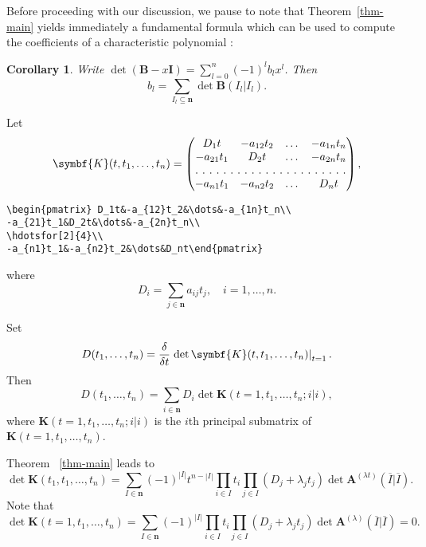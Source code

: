 \documentclass{article}
\newtheorem{cor}[thm]{Corollary}
\theoremstyle{definition}
\theoremstyle{remark}
\newcommand{\thmref}[1]{Theorem~\ref{#1}}
\newcommand{\eval}[2][\right]{\relax
  \ifx#1\right\relax \left.\fi#2#1\rvert}
\newcommand{\envert}[1]{\left\lvert#1\right\rvert}
\begin{document}
Before proceeding with our discussion, we pause to note that
\thmref{thm-main} yields immediately a fundamental formula which can be
used to compute the coefficients of a characteristic polynomial
\cite{mami:matrixth}:
\begin{cor}\label{BI}
Write $\det(\symbf{B}-x\symbf{I})=\sum^n_{l =0}(-1)
^l b_l x^l $. Then
\begin{equation}\label{bl-sum}
b_l =\sum_{I_l \subseteq\symbf{n}}\det\symbf{B}(I_l |I_l ).
\end{equation}
\end{cor}
Let
\begin{equation}
\symbf{K}(t,t_1,\dots,t_n)
=\begin{pmatrix} D_1t&-a_{12}t_2&\dots&-a_{1n}t_n\\
-a_{21}t_1&D_2t&\dots&-a_{2n}t_n\\
\hdotsfor[2]{4}\\
-a_{n1}t_1&-a_{n2}t_2&\dots&D_nt\end{pmatrix},
\end{equation}
\begin{verbatim}
\begin{pmatrix} D_1t&-a_{12}t_2&\dots&-a_{1n}t_n\\
-a_{21}t_1&D_2t&\dots&-a_{2n}t_n\\
\hdotsfor[2]{4}\\
-a_{n1}t_1&-a_{n2}t_2&\dots&D_nt\end{pmatrix}
\end{verbatim}
where
\begin{equation}
D_i=\sum_{j\in\symbf{n}}a_{ij}t_j,\quad i=1,\dots,n.
\end{equation}

Set
\begin{equation*}
D(t_1,\dots,t_n)=\frac{\delta}{\delta t}\eval{\det\symbf{K}(t,t_1,\dots,t_n)
}_{t=1}.
\end{equation*}
Then
\begin{equation}\label{sum-Di}
D(t_1,\dots,t_n)
=\sum_{i\in\symbf{n}}D_i\det\symbf{K}(t=1,t_1,\dots,t_n; i|i),
\end{equation}
where $\symbf{K}(t=1,t_1,\dots,t_n; i|i)$ is the $i$th principal
submatrix of $\symbf{K}(t=1,t_1,\dots,t_n)$.

Theorem ~\ref{thm-main} leads to
\begin{equation}\label{detK1}
\det\symbf{K}(t_1,t_1,\dots,t_n)
=\sum_{I\in\symbf{n}}(-1)^{\envert{I}}t^{n-\envert{I}}
\prod_{i\in I}t_i\prod_{j\in I}(D_j+\lambda_jt_j)\det\symbf{A}
^{(\lambda t)}(\overline{I}|\overline I).
\end{equation}
Note that
\begin{equation}\label{detK2}
\det\symbf{K}(t=1,t_1,\dots,t_n)=\sum_{I\in\symbf{n}}(-1)^{\envert{I}}
\prod_{i\in I}t_i\prod_{j\in I}(D_j+\lambda_jt_j)\det\symbf{A}
^{(\lambda)}(\overline{I}|\overline{I})=0.
\end{equation}
\end{document}
